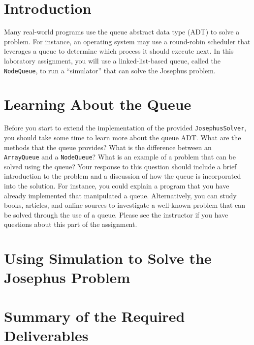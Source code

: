 


\usepackage[compact]{titlesec}


\section*{Introduction}

  Many real-world programs use the queue abstract data type (ADT) to solve a problem.  For instance, an operating system
  may use a round-robin scheduler that leverages a queue to determine which process it should execute next. In this
  laboratory assignment, you will use a linked-list-based queue, called the {\tt NodeQueue}, to run a ``simulator'' that
  can solve the Josephus problem.

\section*{Learning About the Queue}

  Before you start to extend the implementation of the provided {\tt JosephusSolver}, you should take some time to learn
  more about the queue ADT.  What are the methods that the queue provides?  What is the difference between an {\tt
    ArrayQueue} and a {\tt NodeQueue}? What is an example of a problem that can be solved using the queue? Your response
  to this question should include a brief introduction to the problem and a discussion of how the queue is incorporated
  into the solution. For instance, you could explain a program that you have already implemented that manipulated a
  queue.  Alternatively, you can study books, articles, and online sources to investigate a well-known problem that can
  be solved through the use of a queue.  Please see the instructor if you have questions about this part of the
  assignment.

\section*{Using Simulation to Solve the Josephus Problem}
 
\section*{Summary of the Required Deliverables}

